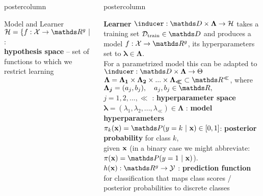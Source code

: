 \documentclass{beamer}
\newlength{\columnheight} %
\begin{document}
\begin{frame}[fragile]{}
\begin{columns}
\begin{column}{.31\textwidth}
\begin{beamercolorbox}[center]{postercolumn}
\begin{minipage}{.98\textwidth}
{\begin{myblock}{Model and Learner}
$\Hspace = \{f : \Xspace \rightarrow \R^g ~|~ f \text{ belongs to a certain functional family}\}$ : \\ \textbf{hypothesis space} -- set of functions to which we restrict learning 					
\end{myblock}\vfill
				}
			\end{minipage}
		\end{beamercolorbox}
	\end{column}
	\begin{column}{.31\textwidth}
		\begin{beamercolorbox}[center]{postercolumn}
			\begin{minipage}{.98\textwidth}
				\parbox[t][\columnheight]{\textwidth}{
\begin{myblock}{} \vspace{-4ex}
\textbf{Learner }$\inducer: \preimageInducerShort \rightarrow \Hspace$  takes a training set  $\Dtrain \in \allDatasets$  and produces a model $f : \Xspace \rightarrow \R^g$, its hyperparameters set to $\bm{\lambda} \in \bm{\Lambda}$.\\
For a parametrized model this can be adapted to $\inducer: \preimageInducerShort \rightarrow \Theta$ \\

$\bm{\Lambda} = \bm{\Lambda_1} \times \bm{\Lambda_2} \times ... \times \bm{\Lambda_{\ll}} \subset \R^{\ll}$, where $\bm{\Lambda_j} = (a_j, b_j), \quad a_j, b_j \in \R,$ \\$j = 1, 2, ... , \ll$ : \textbf{hyperparameter space} \\

$\bm{\lambda} = (\lambda_1, \lambda_2, ..., \lambda_{\ll}) \in \bm{\Lambda}$ : \textbf{model hyperparameters} \\

$\pikx = \postk \in [0, 1]$: \textbf{posterior probability} for class $k$, \\ given $\mathbf{x}$ (in a binary case we might abbreviate: $\pix = \post$). \\

$\hx: \R^g \rightarrow \Yspace$ : \textbf{prediction function} for classification that maps class scores / posterior probabilities to discrete classes \\



\end{myblock}}
\end{minipage}
\end{beamercolorbox}
\end{column}
\end{columns}
\end{frame}
\end{document}

